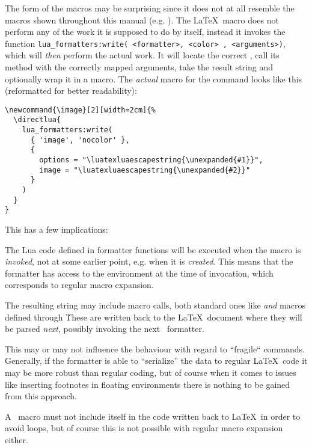 \documentclass[12pt]{scrartcl}
\begin{document}
The form of the macros may be surprising since it does not at all resemble the
macros shown throughout this manual (e.g. ).  The
\LaTeX\ macro does not perform any of the work it is supposed to do by itself,
instead it invokes the function \texttt{lua_formatters:write({
<formatter>, <color> }, <arguments>)}, which will \emph{then} perform the actual
work.  It will locate the correct , call its 
method with the correctly mapped arguments, take the result string and
optionally wrap it in a  macro.  The \emph{actual} macro for the  command looks like this (reformatted for better readability):

\begin{verbatim}
\newcommand{\image}[2][width=2cm]{%
  \directlua{
    lua_formatters:write(
      { 'image', 'nocolor' },
      {
        options = "\luatexluaescapestring{\unexpanded{#1}}",
        image = "\luatexluaescapestring{\unexpanded{#2}}"
      }
    )
  }
}
\end{verbatim}

\noindent This has a few implications:

\begin{itemize*}
\item The Lua code defined in formatter functions will be executed when the
macro is \emph{invoked}, not at some earlier point, e.g. when it is
\emph{created}.  This means that the formatter has access to the environment at
the time of invocation, which corresponds to regular macro expansion.
\item The resulting string may include macro calls, both standard ones like
 \emph{and} macros defined through \luaformatters\.  These are
written back to the \LaTeX\ document where they will be parsed \emph{next},
possibly invoking the next \luaformatters\ formatter.
\item This may or may not influence the behaviour with regard to “fragile“
commands.  Generally, if the formatter is able to “serialize” the data to
regular \LaTeX\ code it may be more robust than regular coding, but of course
when it comes to issues like inserting footnotes in floating environments there
is nothing to be gained from this approach.
\item A \luaformatters\ macro must not include itself in the code
written back to \LaTeX\ in order to avoid loops, but of course this is not
possible with regular macro expansion either.
\end{itemize*}
\end{document}
